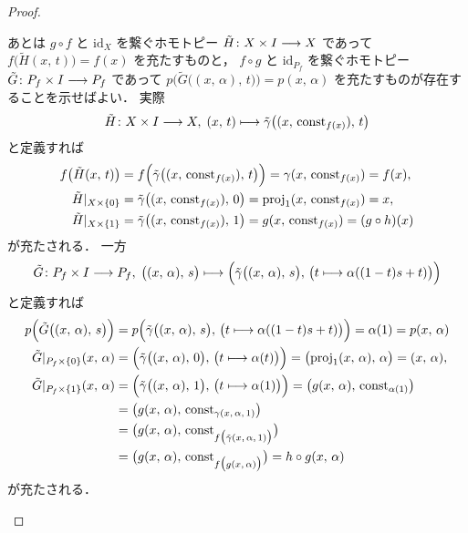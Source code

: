 \documentclass[algtopo_main]{subfiles}
\begin{document}
\begin{proof}
\begin{enumerate}
        あとは $g \circ f$ と $\mathrm{id}_X$ を繋ぐホモトピー $\tilde{H} \colon X \times I \longrightarrow X$ であって $f \bigl(\tilde{H}(x,\, t)\bigr) = f(x)$ を充たすものと，
        $f \circ g$ と $\mathrm{id}_{P_f}$ を繋ぐホモトピー $\tilde{G} \colon P_f \times I \longrightarrow P_f$ であって $p \bigl(\tilde{G}\bigl((x,\, \alpha),\, t\bigr)\bigr) = p(x,\, \alpha)$ を充たすものが存在することを示せばよい．
        実際
        \begin{align}
            \tilde{H} \colon X \times I \longrightarrow X,\; (x,\, t) \longmapsto \tilde{\gamma} \bigl( (x,\, \mathrm{const}_{f(x)}),\, t \bigr) 
        \end{align}
        と定義すれば
        \begin{align}
            f \bigl(\tilde{H}(x,\, t) \bigr) &= f \Bigl( \tilde{\gamma} \bigl( (x,\, \mathrm{const}_{f(x)}),\, t \bigr)  \Bigr) = \gamma (x,\, \mathrm{const}_{f(x)}) = f(x), \\
            \tilde{H}|_{X \times \{0\}} &= \tilde{\gamma} \bigl( (x,\, \mathrm{const}_{f(x)}),\, 0 \bigr) = \mathrm{proj}_1 (x,\, \mathrm{const}_{f(x)}) = x, \\
            \tilde{H}|_{X \times \{1\}} &= \tilde{\gamma} \bigl( (x,\, \mathrm{const}_{f(x)}),\, 1 \bigr) =  g(x,\, \mathrm{const}_{f(x)}) = (g \circ h)(x)
        \end{align}
        が充たされる．
        一方
        \begin{align}
            \tilde{G} \colon P_f \times I \longrightarrow P_f,\;\bigl( (x,\, \alpha),\, s \bigr) \longmapsto \Bigl(\tilde{\gamma}\bigl((x,\, \alpha),\, s\bigr),\, \bigl( t \longmapsto \alpha((1-t)s + t) \bigr)\Bigr)
        \end{align}
        と定義すれば
        \begin{align}
            p \Bigl( \tilde{G}\bigl( (x,\, \alpha),\, s \bigr)\Bigr) &= p\Bigl(\tilde{\gamma}\bigl((x,\, \alpha),\, s\bigr),\, \bigl( t \longmapsto \alpha((1-t)s + t) \bigr)\Bigr) = \alpha(1) = p(x,\, \alpha) \\
            \tilde{G}|_{P_f \times \{0\}}(x,\, \alpha) &= \Bigl(\tilde{\gamma}\bigl((x,\, \alpha),\, 0\bigr),\, \bigl( t \longmapsto \alpha(t) \bigr)\Bigr) =\bigl( \mathrm{proj}_1(x,\, \alpha),\, \alpha \bigr) = (x,\, \alpha), \\
            \tilde{G}|_{P_f \times \{1\}}(x,\, \alpha) &= \Bigl(\tilde{\gamma}\bigl((x,\, \alpha),\, 1\bigr),\, \bigl( t \longmapsto \alpha(1) \bigr)\Bigr) =\bigl( g(x,\, \alpha),\, \mathrm{const}_{\alpha(1)} \bigr) \\
            &= \bigl( g(x,\, \alpha),\, \mathrm{const}_{\gamma(x,\, \alpha,\, 1)} \bigr) \\
            &= \bigl( g(x,\, \alpha),\, \mathrm{const}_{f \bigl(\tilde{\gamma}(x,\, \alpha,\, 1)\bigr)} \bigr) \\
            &= \bigl( g(x,\, \alpha),\, \mathrm{const}_{f \bigl(g(x,\, \alpha)\bigr)} \bigr) = h\circ g(x,\, \alpha)
        \end{align}
        が充たされる．
    \end{enumerate}
\end{proof}
\end{document}
